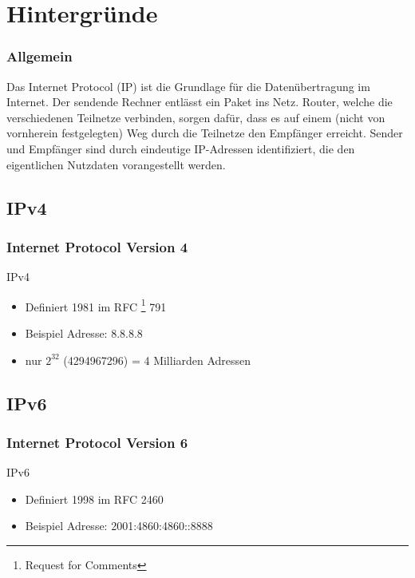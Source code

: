 \documentclass[xcolor=dvipsnames]{beamer}
\subtitle{Modul WIN11} %
\institute{AKAD Pinneberg + Stuttgart} %
\title{\Title}
\author{\Author}
\date{\today}
\begin{document}
\begin{frame}
    \titlepage
\end{frame}


\frame{\tableofcontents} 

 
\section{Hintergründe}
\begin{frame} %
 \frametitle{Allgemein}
Das Internet Protocol (IP) ist die Grundlage für die Datenübertragung im Internet. Der sendende Rechner entlässt ein Paket ins Netz. Router, welche die verschiedenen Teilnetze verbinden, sorgen dafür, dass es auf einem (nicht von vornherein festgelegten) Weg durch die Teilnetze den Empfänger erreicht. Sender und Empfänger sind durch eindeutige IP-Adressen identifiziert, die den eigentlichen Nutzdaten vorangestellt werden.
\end{frame}


\subsection{IPv4}
\begin{frame}
 \frametitle{Internet Protocol Version 4}
  \begin{block}{IPv4}
	  \begin{itemize}
	  	\item Definiert 1981 im RFC \footnote{Request for Comments} 791
	  	\item Beispiel Adresse: 8.8.8.8
  		\item nur $2^{32}$ (4294967296) = 4 Milliarden Adressen
	  \end{itemize}
  \end{block}
\end{frame}

\subsection{IPv6}
\begin{frame}
  \frametitle{Internet Protocol Version 6}
  \begin{block}{IPv6}
	  \begin{itemize}
  		\item Definiert 1998 im RFC 2460 
  		\item Beispiel Adresse: 2001:4860:4860::8888
	  \end{itemize}
  \end{block}
\end{frame}
\end{document}

